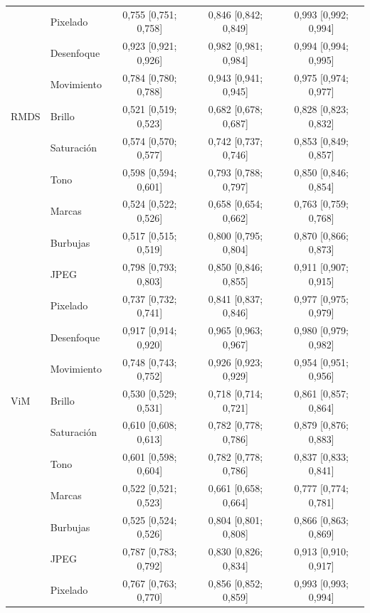 {\begin{longtable}{llccc}
 & Pixelado & 0{,}755 [0{,}751; 0{,}758] & 0{,}846 [0{,}842; 0{,}849] & 0{,}993 [0{,}992; 0{,}994] \\
 & Desenfoque & 0{,}923 [0{,}921; 0{,}926] & 0{,}982 [0{,}981; 0{,}984] & 0{,}994 [0{,}994; 0{,}995] \\
 & Movimiento & 0{,}784 [0{,}780; 0{,}788] & 0{,}943 [0{,}941; 0{,}945] & 0{,}975 [0{,}974; 0{,}977] \\
\midrule
RMDS & Brillo & 0{,}521 [0{,}519; 0{,}523] & 0{,}682 [0{,}678; 0{,}687] & 0{,}828 [0{,}823; 0{,}832] \\
 & Saturación & 0{,}574 [0{,}570; 0{,}577] & 0{,}742 [0{,}737; 0{,}746] & 0{,}853 [0{,}849; 0{,}857] \\
 & Tono & 0{,}598 [0{,}594; 0{,}601] & 0{,}793 [0{,}788; 0{,}797] & 0{,}850 [0{,}846; 0{,}854] \\
 & Marcas & 0{,}524 [0{,}522; 0{,}526] & 0{,}658 [0{,}654; 0{,}662] & 0{,}763 [0{,}759; 0{,}768] \\
 & Burbujas & 0{,}517 [0{,}515; 0{,}519] & 0{,}800 [0{,}795; 0{,}804] & 0{,}870 [0{,}866; 0{,}873] \\
 & JPEG & 0{,}798 [0{,}793; 0{,}803] & 0{,}850 [0{,}846; 0{,}855] & 0{,}911 [0{,}907; 0{,}915] \\
 & Pixelado & 0{,}737 [0{,}732; 0{,}741] & 0{,}841 [0{,}837; 0{,}846] & 0{,}977 [0{,}975; 0{,}979] \\
 & Desenfoque & 0{,}917 [0{,}914; 0{,}920] & 0{,}965 [0{,}963; 0{,}967] & 0{,}980 [0{,}979; 0{,}982] \\
 & Movimiento & 0{,}748 [0{,}743; 0{,}752] & 0{,}926 [0{,}923; 0{,}929] & 0{,}954 [0{,}951; 0{,}956] \\
\midrule
ViM & Brillo & 0{,}530 [0{,}529; 0{,}531] & 0{,}718 [0{,}714; 0{,}721] & 0{,}861 [0{,}857; 0{,}864] \\
 & Saturación & 0{,}610 [0{,}608; 0{,}613] & 0{,}782 [0{,}778; 0{,}786] & 0{,}879 [0{,}876; 0{,}883] \\
 & Tono & 0{,}601 [0{,}598; 0{,}604] & 0{,}782 [0{,}778; 0{,}786] & 0{,}837 [0{,}833; 0{,}841] \\
 & Marcas & 0{,}522 [0{,}521; 0{,}523] & 0{,}661 [0{,}658; 0{,}664] & 0{,}777 [0{,}774; 0{,}781] \\
 & Burbujas & 0{,}525 [0{,}524; 0{,}526] & 0{,}804 [0{,}801; 0{,}808] & 0{,}866 [0{,}863; 0{,}869] \\
 & JPEG & 0{,}787 [0{,}783; 0{,}792] & 0{,}830 [0{,}826; 0{,}834] & 0{,}913 [0{,}910; 0{,}917] \\
 & Pixelado & 0{,}767 [0{,}763; 0{,}770] & 0{,}856 [0{,}852; 0{,}859] & 0{,}993 [0{,}993; 0{,}994] \\

\end{longtable}}
